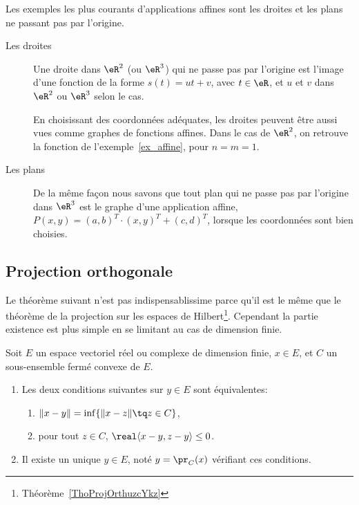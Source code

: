 \begin{example}
	Les exemples les plus courants d'applications affines sont les droites et les plans ne passant pas par l'origine.
	\begin{description}
		\item[Les droites] Une droite dans \( \eR^2\) (ou \( \eR^3\)) qui ne passe pas par l'origine est l'image d'une fonction de la forme \( s(t) =u t +v\), avec \( t \in \eR\), et \( u\) et \( v\) dans \( \eR^2\) ou \( \eR^3\) selon le cas.

			En choisissant des coordonnées adéquates, les droites peuvent être aussi vues comme graphes de fonctions affines. Dans le cas de \( \eR^2\), on retrouve la fonction de l'exemple~\ref{ex_affine}, pour \( n = m = 1 \).

		\item[Les plans]
			De la même façon nous savons que tout plan qui ne passe pas par l'origine dans \( \eR^3\) est le graphe d'une application affine, \( P(x,y)= (a,b)^T\cdot(x,y)^T+(c,d)^T\), lorsque les coordonnées sont bien choisies.
	\end{description}
\end{example}


\subsection{Projection orthogonale}

Le théorème suivant n'est pas indispensablissime parce qu'il est le même que le théorème de la projection sur les espaces de Hilbert\footnote{Théorème~\ref{ThoProjOrthuzcYkz}}. Cependant la partie existence est plus simple en se limitant au cas de dimension finie.
\begin{theoremDef}  \label{ThoWKwosrH}
	Soit \( E\) un espace vectoriel réel ou complexe de dimension finie, \( x\in E\), et \( C\) un sous-ensemble fermé convexe de \(E\).
	\begin{enumerate}
		\item
		      Les deux conditions suivantes sur \( y\in E\) sont équivalentes:
		      \begin{enumerate}
			      \item   \label{zzETsfYCSItemi}
			            \( \| x-y \|=\inf\{ \| x-z \|\tq z\in C \}\),
			            \item\label{zzETsfYCSItemii}
			            pour tout \( z\in C\), \( \real\langle x-y, z-y\rangle \leq 0\).
		      \end{enumerate}
		\item
		      Il existe un unique \( y\in E\), noté \( y=\pr_C(x)\) vérifiant ces conditions.
	\end{enumerate}
\end{theoremDef}

